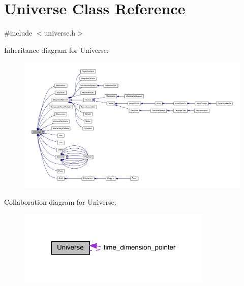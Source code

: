 \hypertarget{class_universe}{}\section{Universe Class Reference}
\label{class_universe}


{\ttfamily \#include $<$universe.\+h$>$}



Inheritance diagram for Universe\+:\nopagebreak
\begin{figure}[H]
\begin{center}
\leavevmode
\includegraphics[width=350pt]{class_universe__inherit__graph}
\end{center}
\end{figure}


Collaboration diagram for Universe\+:
\nopagebreak
\begin{figure}[H]
\begin{center}
\leavevmode
\includegraphics[width=263pt]{class_universe__coll__graph}
\end{center}
\end{figure}
